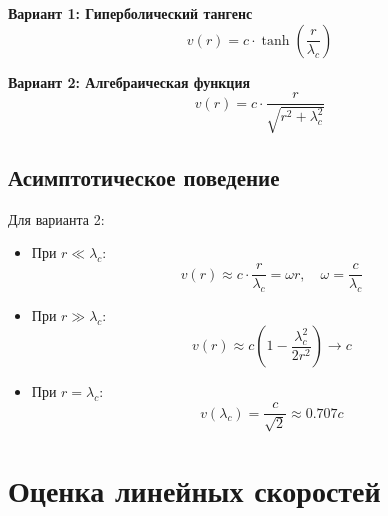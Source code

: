 \documentclass[12pt,a4paper]{article}
\begin{document}
\textbf{Вариант 1: Гиперболический тангенс}
\begin{equation}
    v(r) = c \cdot \tanh\left(\frac{r}{\lambda_c}\right)
\end{equation}

\textbf{Вариант 2: Алгебраическая функция}
\begin{equation}
    v(r) = c \cdot \frac{r}{\sqrt{r^2 + \lambda_c^2}}
\end{equation}

\subsection{Асимптотическое поведение}

Для варианта 2:

\begin{itemize}
    \item При $r \ll \lambda_c$:
    \begin{equation}
        v(r) \approx c \cdot \frac{r}{\lambda_c} = \omega r, \quad \omega = \frac{c}{\lambda_c}
    \end{equation}

    \item При $r \gg \lambda_c$:
    \begin{equation}
        v(r) \approx c \left(1 - \frac{\lambda_c^2}{2r^2}\right) \to c
    \end{equation}

    \item При $r = \lambda_c$:
    \begin{equation}
        v(\lambda_c) = \frac{c}{\sqrt{2}} \approx 0.707c
    \end{equation}
\end{itemize}

\section{Оценка линейных скоростей}
\end{document}
